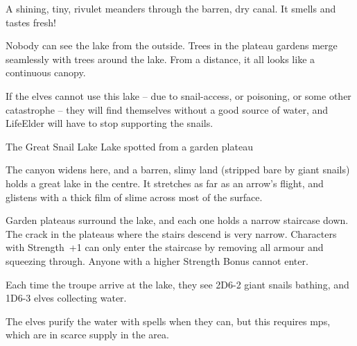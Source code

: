 \begin{multicols}{2}
\begin{boxtext}
  A shining, tiny, rivulet meanders through the barren, dry canal.
  It smells and tastes fresh!
\end{boxtext}

Nobody can see the lake from the outside.
Trees in the plateau gardens merge seamlessly with trees around the lake.
From a distance, it all looks like a continuous canopy.

If the elves cannot use this lake -- due to snail-access, or poisoning, or some other catastrophe -- they will find themselves without a good source of water, and \gls{LifeElder} will have to stop supporting the snails.

{The Great Snail Lake}%
{Lake spotted from a garden plateau}%

The canyon widens here, and a barren, slimy land (stripped bare by giant snails) holds a great lake in the centre.
It stretches as far as an arrow's flight, and glistens with a thick film of slime across most of the surface.

Garden plateaus surround the lake, and each one holds a narrow staircase down.
The crack in the plateaus where the stairs descend is very narrow.
Characters with Strength~+1 can only enter the staircase by removing all armour and squeezing through.
Anyone with a higher Strength Bonus cannot enter.

Each time the troupe arrive at the lake,
they see 2D6-2 giant snails bathing, and 1D6-3 elves collecting water.

The elves purify the water with spells when they can, but this requires \glspl{mp}, which are in scarce supply in the area.

\end{multicols}
